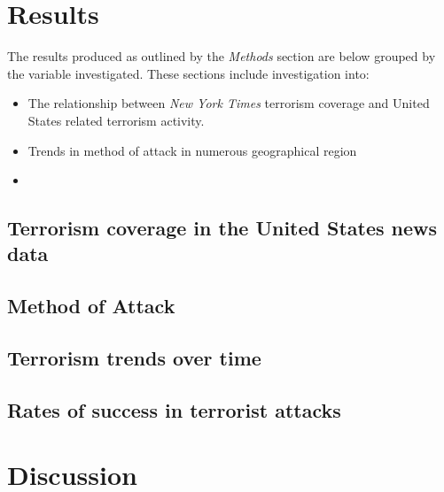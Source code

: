 \documentclass[10pt,a4paper]{article}
\begin{document}
\section{Results}
The results produced as outlined by the \textit{Methods} section are below grouped by the variable investigated. These sections include investigation into:\\
\begin{itemize}
\item The relationship between \textit{New York Times} terrorism coverage and United States related terrorism activity.
\item Trends in method of attack in numerous geographical region
\item 

\end{itemize}

\subsection{Terrorism coverage in the United States news data}

\subsection{Method of Attack}

\subsection{Terrorism trends over time}

\subsection{Rates of success in terrorist attacks}

	\section{Discussion} 
\end{document}
